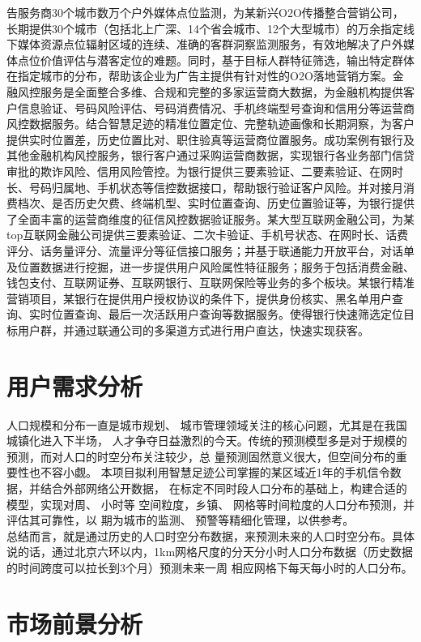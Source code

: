 告服务商30个城市数万个户外媒体点位监测，为某新兴O2O传播整合营销公司，长期提供30个城市（包括北上广深、14个省会城市、12个大型城市）的万余指定线下媒体资源点位辐射区域的连续、准确的客群洞察监测服务，有效地解决了户外媒体点位价值评估与潜客定位的难题。同时，基于目标人群特征筛选，输出特定群体在指定城市的分布，帮助该企业为广告主提供有针对性的O2O落地营销方案。金融风控服务是全面整合多维、合规和完整的多家运营商大数据，为金融机构提供客户信息验证、号码风险评估、号码消费情况、手机终端型号查询和信用分等运营商风控数据服务。结合智慧足迹的精准位置定位、完整轨迹画像和长期洞察，为客户提供实时位置差，历史位置比对、职住验真等运营商位置服务。成功案例有银行及其他金融机构风控服务，银行客户通过采购运营商数据，实现银行各业务部门信贷审批的欺诈风险、信用风险管控。为银行提供三要素验证、二要素验证、在网时长、号码归属地、手机状态等信控数据接口，帮助银行验证客户风险。并对接月消费档次、是否历史欠费、终端机型、实时位置查询、历史位置验证等，为银行提供了全面丰富的运营商维度的征信风控数据验证服务。某大型互联网金融公司，为某top互联网金融公司提供三要素验证、二次卡验证、手机号状态、在网时长、话费评分、话务量评分、流量评分等征信接口服务；并基于联通能力开放平台，对话单及位置数据进行挖掘，进一步提供用户风险属性特征服务；服务于包括消费金融、钱包支付、互联网证券、互联网银行、互联网保险等业务的多个板块。某银行精准营销项目，某银行在提供用户授权协议的条件下，提供身份核实、黑名单用户查询、实时位置查询、最后一次活跃用户查询等数据服务。使得银行快速筛选定位目标用户群，并通过联通公司的多渠道方式进行用户直达，快速实现获客。
\section{用户需求分析}
人口规模和分布一直是城市规划、 城市管理领域关注的核心问题，尤其是在我国城镇化进入下半场， 人才争夺日益激烈的今天。传统的预测模型多是对于规模的预测，而对人口的时空分布关注较少，总
量预测固然意义很大，但空间分布的重要性也不容小觑。 本项目拟利用智慧足迹公司掌握的某区域近1年的手机信令数据，并结合外部网络公开数据，
在标定不同时段人口分布的基础上，构建合适的模型，实现对周、 小时等
空间粒度，乡镇、 网格等时间粒度的人口分布预测，并评估其可靠性，以
期为城市的监测、 预警等精细化管理，以供参考。\\
总结而言，就是通过历史的人口时空分布数据，来预测未来的人口时空分布。具体说的话，通过北京六环以内，1km网格尺度的分天分小时人口分布数据（历史数据的时间跨度可以拉长到3个月）预测未来一周 相应网格下每天每小时的人口分布。
\section{市场前景分析}
